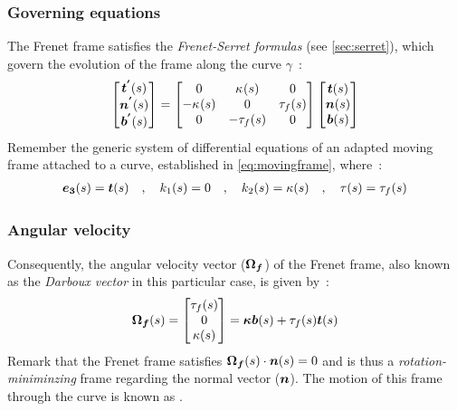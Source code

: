 \subsubsection{Governing equations}\label{sec:serretfrenet}
The Frenet frame satisfies the \emph{Frenet-Serret formulas} (see \cref{sec:serret}), which govern the evolution of the frame along the curve $\gamma$~:
\begin{equation}
	\begin{bmatrix}
		\boldsymbol{t^{'}}(s) \\
		\boldsymbol{n^{'}}(s) \\
		\boldsymbol{b^{'}}(s)
	\end{bmatrix}
	=
	\begin{bmatrix}
		0 & \kappa_{}(s) & 0 \\
		-\kappa_{}(s) & 0 & \tau_f(s) \\
		0 & -\tau_f(s) & 0
	\end{bmatrix}
	\begin{bmatrix}
		\boldsymbol{t}(s) \\
		\boldsymbol{n}(s) \\
		\boldsymbol{b}(s)
	\end{bmatrix}
\label{eq:frenetframegoverning}
\end{equation}
Remember the generic system of differential equations of an adapted moving frame attached to a curve, established in \cref{eq:movingframe}, where~:
\begin{gather}
\boldsymbol{e_{3}}(s) = \boldsymbol{t}(s)
\quad,\quad
k_{1}(s) = 0
\quad,\quad
k_{2}(s) = \kappa(s)
\quad,\quad
\tau(s) = \tau_{f}(s)
\end{gather}

\subsubsection{Angular velocity}
Consequently, the angular velocity vector ($\boldsymbol{\Omega_{f}}$) of the Frenet frame, also known as the \emph{Darboux vector} in this particular case, is given by~:
\begin{equation}
	\boldsymbol{\Omega_f}(s)
	=
	\begin{bmatrix}
		\tau_{f}(s) \\
		0 \\
		\kappa(s)
	\end{bmatrix}
	= \boldsymbol{\kappa b}(s) +\tau_{f}(s) \boldsymbol{t}(s)
\end{equation}
Remark that the Frenet frame satisfies $\boldsymbol{\Omega_f}(s) \cdot \boldsymbol{n}(s) = 0$ and is thus a \emph{rotation-miniminzing} frame regarding the normal vector ($\boldsymbol{n}$). The motion of this frame through the curve is known as .

